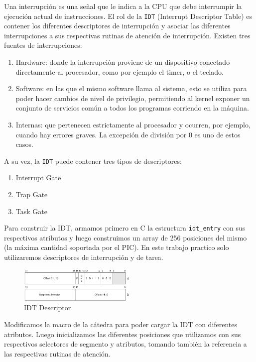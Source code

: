 Una interrupción es una señal que le indica a la CPU que debe interrumpir la ejecución actual de instrucciones. El rol de la \texttt{IDT} (Interrupt Descriptor Table) es contener los diferentes descriptores de interrupción y asociar las diferentes interrupciones a sus respectivas rutinas de atención de interrupción. Existen tres fuentes de interrupciones:

\begin{enumerate}
\item Hardware: donde la interrupción proviene de un dispositivo conectado directamente al procesador, como por ejemplo el timer, o el teclado.
\item Software: en las que el mismo software llama al sistema, esto se utiliza para poder hacer cambios de nivel de privilegio, permitiendo al kernel exponer un conjunto de servicios común a todos los programas corriendo en la máquina.
\item Internas: que pertenecen estrictamente al procesador y ocurren, por ejemplo, cuando hay errores graves. La excepción de división por 0 es uno de estos casos.
\end{enumerate}

A su vez, la \texttt{IDT} puede contener tres tipos de descriptores:

\begin{enumerate}
\item Interrupt Gate
\item Trap Gate
\item Task Gate
\end{enumerate}

Para construir la IDT, armamos primero en C la estructura \texttt{idt\_entry} con sus respectivos atributos y luego construimos un array de 256 posiciones del mismo (la máxima cantidad soportada por el PIC). En este trabajo practico solo utilizaremos descriptores de interrupción y de tarea.

\begin{figure}[h!]
  \centering
    \includegraphics[width=0.5\textwidth]{images/idt_desc}
  \caption{IDT Descriptor}
\end{figure}

Modificamos la macro de la cátedra para poder cargar la IDT con diferentes atributos. Luego inicializamos las diferentes posiciones que utilizamos con sus respectivos selectores de segmento y atributos, tomando también la referencia a las respectivas rutinas de atención.

